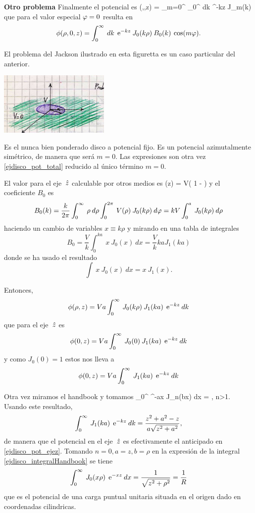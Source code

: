 \documentclass[10pt,oneside]{CBFT_book}
\begin{document}
\begin{ejemplo}{\bf Otro problema}
Finalmente el potencial es
\be
	\phi(\rho,\vp,z) = \sum_{m=0}^\infty \: \int_0^{\infty} \: dk \:
	\euler^{-kz} \: J_{m}(k\rho) 
	\label{ejdisco_pot_total}
\ee
que para el valor especial $\varphi=0$ resulta en
\[
	\phi(\rho,0,z) =  \int_0^{\infty} \: dk \:
	\:\mathrm{e}^{-kz} \: J_{0}(k\rho) \: B_0(k) \: \cos(m\varphi).
\]

El problema del Jackson ilustrado en esta figuretta es un caso particular del anterior.

\includegraphics[width=0.4\textwidth]{images/fig_ft1_sep_cilin_C.jpg} 

Es el nunca bien ponderado disco a potencial fijo. Es un potencial azimutalmente simétrico, 
de manera que será $ m = 0 $. Las expresiones son otra vez \eqref{ejdisco_pot_total} reducido
al único término $m=0$.

El valor para el eje $\:\hat{z}$ calculable por otros medios es
\be
	\phi(z) = V\left( 1 -  \right)
	\label{ejdisco_pot_ejez}
\ee
y el coeficiente $B_0$ es
\[
	B_0(k) = \frac{k}{2\pi} \int_0^\infty \: \rho \: d\rho 
	\int_0^{2\pi} \: V(\rho) \: J_0(k\rho)\: d\varphi  = 
	k V \int_0^a \: J_0(k\rho)\: d\rho 
\]
haciendo un cambio de variables $x\equiv k\rho$ y mirando en una tabla de integrales
\[
	B_0 = \frac{V}{k} \int_0^{ka} \: x \: J_0(x)\: dx = \frac{V}{k} k a J_1(ka)
\]
donde se ha usado el resultado
\[
	\int \: x \: J_0(x)\: dx = x \: J_1(x).
\]

Entonces,
\[
	\phi(\rho,z) = V a \int_0^\infty \: J_0(k\rho) \: J_1(ka) \: \:\mathrm{e}^{-kz} \: dk
\]
que para el eje $\:\hat{z}$ es
\[
	\phi(0,z) =  V a \int_0^\infty \: J_0(0) \: J_1(ka) \: \:\mathrm{e}^{-kz} \: dk 
\]
y como $J_0(0)=1$ estos nos lleva a 
\[
	\phi(0,z) = V a \int_0^\infty \: J_1(ka) \: \:\mathrm{e}^{-kz} \: dk
\]

Otra vez miramos el handbook y tomamos
\be
	\int_0^\infty \: \euler^{-ax} \: J_n(bx) \: dx = 
	, \qquad n>1.
	\label{ejdisco_integralHandbook}
\ee
Usando este resultado,
\[
	\int_0^\infty \: J_1(ka) \: \:\mathrm{e}^{-kz} \: dk = \frac{z^2+a^2-z}{a\sqrt{z^2+a^2}},
\]
de manera que el potencial en el eje $\:\hat{z}$ es efectivamente el anticipado en \eqref{ejdisco_pot_ejez}.
Tomando $n=0,a=z,b=\rho$ en la expresión de la integral \eqref{ejdisco_integralHandbook} se tiene
\[
	\int_0^\infty \: J_0(x\rho) \: \:\mathrm{e}^{-xz} \: dx = 
	\frac{1}{\sqrt{z^2+\rho^2}} = \frac{1}{R}
\]
que es el potencial de una carga puntual unitaria situada en el origen dado en 
coordenadas cilindricas.
 

\end{ejemplo}
\end{document}
